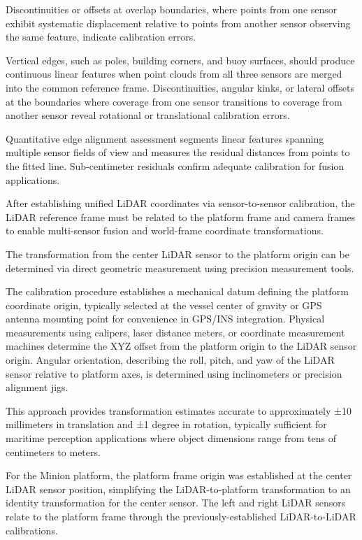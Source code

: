 Discontinuities or offsets at overlap boundaries, where points from one sensor exhibit systematic displacement relative to points from another sensor observing the same feature, indicate calibration errors.


Vertical edges, such as poles, building corners, and buoy surfaces, should produce continuous linear features when point clouds from all three sensors are merged into the common reference frame.
Discontinuities, angular kinks, or lateral offsets at the boundaries where coverage from one sensor transitions to coverage from another sensor reveal rotational or translational calibration errors.

Quantitative edge alignment assessment segments linear features spanning multiple sensor fields of view and measures the residual distances from points to the fitted line.
Sub-centimeter residuals confirm adequate calibration for fusion applications.


After establishing unified LiDAR coordinates via sensor-to-sensor calibration, the LiDAR reference frame must be related to the platform frame and camera frames to enable multi-sensor fusion and world-frame coordinate transformations.


The transformation from the center LiDAR sensor to the platform origin can be determined via direct geometric measurement using precision measurement tools.

The calibration procedure establishes a mechanical datum defining the platform coordinate origin, typically selected at the vessel center of gravity or GPS antenna mounting point for convenience in GPS/INS integration.
Physical measurements using calipers, laser distance meters, or coordinate measurement machines determine the XYZ offset from the platform origin to the LiDAR sensor origin.
Angular orientation, describing the roll, pitch, and yaw of the LiDAR sensor relative to platform axes, is determined using inclinometers or precision alignment jigs.

This approach provides transformation estimates accurate to approximately ±10 millimeters in translation and ±1 degree in rotation, typically sufficient for maritime perception applications where object dimensions range from tens of centimeters to meters.

For the Minion platform, the platform frame origin was established at the center LiDAR sensor position, simplifying the LiDAR-to-platform transformation to an identity transformation for the center sensor.
The left and right LiDAR sensors relate to the platform frame through the previously-established LiDAR-to-LiDAR calibrations.

